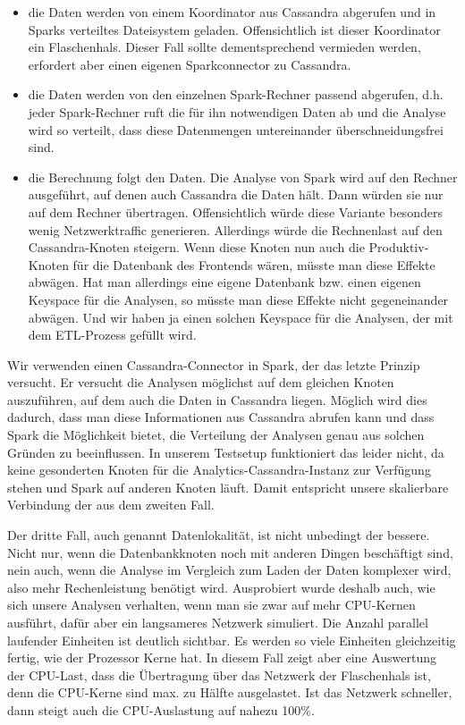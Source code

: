 \begin{itemize}
\item die Daten werden von einem Koordinator aus Cassandra abgerufen und
in Sparks verteiltes Dateisystem geladen. Offensichtlich ist dieser
Koordinator ein Flaschenhals. Dieser Fall sollte dementsprechend
vermieden werden, erfordert aber einen eigenen Sparkconnector zu
Cassandra.
\item die Daten werden von den einzelnen Spark-Rechner passend
abgerufen, d.h. jeder Spark-Rechner ruft die für ihn notwendigen Daten
ab und die Analyse wird so verteilt, dass diese Datenmengen
untereinander überschneidungsfrei sind.
\item die Berechnung folgt den Daten. Die Analyse von Spark wird auf den
Rechner ausgeführt, auf denen auch Cassandra die Daten hält. Dann
würden sie nur auf dem Rechner übertragen. Offensichtlich würde diese
Variante besonders wenig Netzwerktraffic generieren. Allerdings würde
die Rechnenlast auf den Cassandra-Knoten steigern. Wenn diese Knoten
nun auch die Produktiv-Knoten für die Datenbank des Frontends wären,
müsste man diese Effekte abwägen. Hat man allerdings eine eigene
Datenbank bzw. einen eigenen Keyspace für die Analysen, so müsste man
diese Effekte nicht gegeneinander abwägen. Und wir haben ja einen
solchen Keyspace für die Analysen, der mit dem ETL-Prozess gefüllt wird.
\end{itemize}
Wir verwenden einen Cassandra-Connector in Spark, der das letzte Prinzip
versucht. Er versucht die Analysen möglichst auf dem gleichen Knoten
auszuführen, auf dem auch die Daten in Cassandra liegen. Möglich wird
dies dadurch, dass man diese Informationen aus Cassandra abrufen kann
und dass Spark die Möglichkeit bietet, die Verteilung der Analysen
genau aus solchen Gründen zu beeinflussen. In unserem Testsetup
funktioniert das leider nicht, da keine gesonderten Knoten für die
Analytics-Cassandra-Instanz zur Verfügung stehen und Spark auf anderen
Knoten läuft. Damit entspricht unsere skalierbare Verbindung der aus
dem zweiten Fall.

Der dritte Fall, auch genannt Datenlokalität, ist nicht unbedingt der
bessere. Nicht nur, wenn die Datenbankknoten noch mit anderen Dingen
beschäftigt sind, nein auch, wenn die Analyse im Vergleich zum Laden
der Daten komplexer wird, also mehr Rechenleistung benötigt wird.
Ausprobiert wurde deshalb auch, wie sich unsere Analysen verhalten,
wenn man sie zwar auf mehr CPU-Kernen ausführt, dafür aber ein
langsameres Netzwerk simuliert. Die Anzahl parallel laufender Einheiten
ist deutlich sichtbar. Es werden so viele Einheiten gleichzeitig
fertig, wie der Prozessor Kerne hat. In diesem Fall zeigt aber eine
Auswertung der CPU-Last, dass die Übertragung über das Netzwerk der
Flaschenhals ist, denn die CPU-Kerne sind max. zu Hälfte ausgelastet.
Ist das Netzwerk schneller, dann steigt auch die CPU-Auslastung auf
nahezu 100\%.

